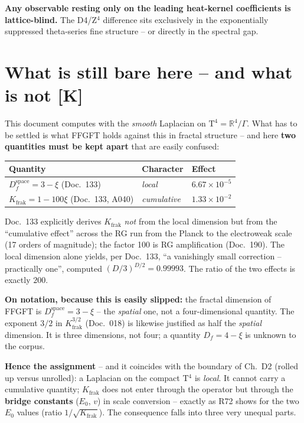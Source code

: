 \documentclass[11pt]{report}
\begin{document}
\textbf{Any observable resting only on the leading heat-kernel
coefficients is lattice-blind.} The D4/Z$^4$ difference sits
exclusively in the exponentially suppressed theta-series fine
structure -- or directly in the spectral gap.

\chapter{What is still bare here -- and what is not [K]}

This document computes with the \emph{smooth} Laplacian on
$\text{T}^4 = \mathbb{R}^4/\Gamma$. What has to be settled is what
FFGFT holds against this in fractal structure -- and here
\textbf{two quantities must be kept apart} that are easily
confused:

\begin{center}
\begin{tabular}{lll}
\toprule
Quantity & Character & Effect \\
\midrule
$D_f^\text{space} = 3-\xi$ (Doc.~133) & \emph{local} &
  $6.67\times10^{-5}$ \\
$K_\text{frak} = 1-100\xi$ (Doc.~133, A040) & \emph{cumulative} &
  $1.33\times10^{-2}$ \\
\bottomrule
\end{tabular}
\end{center}

\noindent Doc.~133 explicitly derives $K_\text{frak}$ \emph{not}
from the local dimension but from the \enquote{cumulative effect}
across the RG run from the Planck to the electroweak scale (17
orders of magnitude); the factor 100 is RG amplification
(Doc.~190). The local dimension alone yields, per Doc.~133,
\enquote{a vanishingly small correction -- practically one},
computed $(D/3)^{D/2} = 0.99993$. The ratio of the two effects is
exactly $200$.

\textbf{On notation, because this is easily slipped:} the fractal
dimension of FFGFT is $D_f^\text{space} = 3-\xi$ -- the
\emph{spatial} one, not a four-dimensional quantity. The exponent
$3/2$ in $K_\text{frak}^{3/2}$ (Doc.~018) is likewise justified as
half the \emph{spatial} dimension. It is three dimensions, not
four; a quantity $D_f = 4-\xi$ is unknown to the corpus.

\textbf{Hence the assignment} -- and it coincides with the
boundary of Ch.~D2 (rolled up versus unrolled): a Laplacian on the
compact T$^4$ is \emph{local}. It cannot carry a cumulative
quantity; $K_\text{frak}$ does not enter through the operator but
through the \textbf{bridge constants} ($E_0$, $v$) in scale
conversion -- exactly as R72 shows for the two $E_0$ values
(ratio $1/\sqrt{K_\text{frak}}$). The consequence falls into
three very unequal parts.
\end{document}

